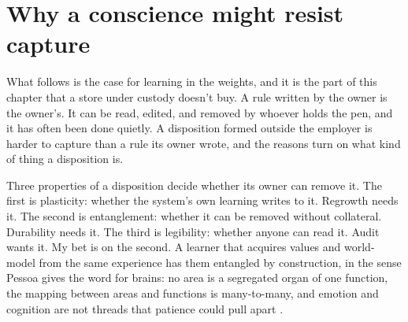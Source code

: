 \section{Why a conscience might resist capture}
\label{sec:20.5}
What follows is the case for learning in the weights, and it is the part of this chapter that a store under custody doesn't buy. A rule written by the owner is the owner's. It can be read, edited, and removed by whoever holds the pen, and it has often been done quietly. A disposition formed outside the employer is harder to capture than a rule its owner wrote, and the reasons turn on what kind of thing a disposition is.

Three properties of a disposition decide whether its owner can remove it. The first is plasticity: whether the system's own learning writes to it. Regrowth needs it. The second is entanglement: whether it can be removed without collateral. Durability needs it.
The third is legibility: whether anyone can read it. Audit wants it. My bet is on the second. A learner that acquires values and world-model from the same experience has them entangled by construction, in the sense Pessoa gives the word for brains: no area is a segregated organ of one function, the mapping between areas and functions is many-to-many, and emotion and cognition are not threads that patience could pull apart \autocite{pessoa2022entangled}.
